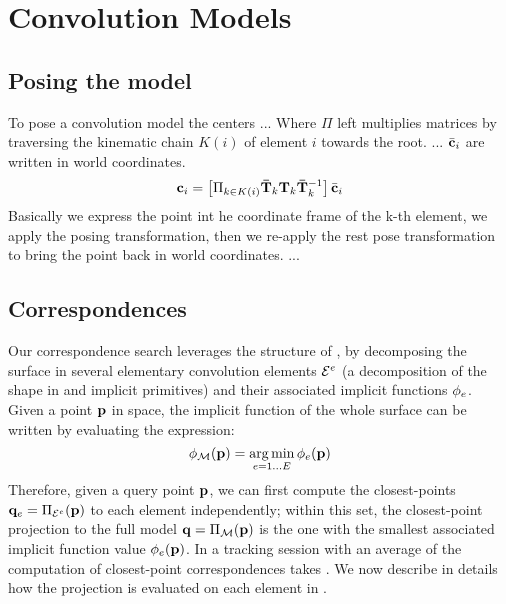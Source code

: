 \section{Convolution Models}


\subsection{Posing the model}
\label{sec:posing}
% 
\begin{DRAFT}
To pose a convolution model the centers ... 
Where $\Pi$ left multiplies matrices by traversing the kinematic chain $K(i)$ of element $i$ towards the root.
... $\bar{\mathbf{c}}_i$ are written in world coordinates.
% 
\begin{equation}
\mathbf{c}_i = \left[ \Pi_{k \in K(i)} \mathbf{\bar{T}}_k \mathbf{T}_k \mathbf{\bar{T}}_k^{-1} \right] \bar{\mathbf{c}}_i
\label{eq:kinematic}
\end{equation}
% 
Basically we express the point int he coordinate frame of the k-th element, we apply the posing transformation, then we re-apply the rest pose transformation to bring the point back in world coordinates. ... 
\end{DRAFT}

\subsection{Correspondences}
\label{sec:corresp}
Our correspondence search leverages the structure of , by decomposing the surface in several elementary convolution elements $\mathcal{E}^e$ (a decomposition of the shape in  and  implicit primitives) and their associated implicit functions $\phi_e$. Given a point $\mathbf{p}$ in space, the implicit function of the whole surface can be written by evaluating the expression:
\begin{equation}
\phi_{\mathcal{M}}(\mathbf{p}) = \operatorname*{arg\,min}_{e=1 \dots E} \phi_e(\mathbf{p})
\label{eq:piecewise}
\end{equation}
Therefore, given a query point $\mathbf{p}$, we can first compute the closest-points $\mathbf{q}_e = \Pi_{\mathcal{E}^e}(\mathbf{p})$ to each element independently; within this set, the closest-point projection to the full model $\mathbf{q} = \Pi_{\mathcal{M}}(\mathbf{p})$ is the one with the smallest associated implicit function value $\phi_e(\mathbf{p})$. In a tracking session with an average of  the computation of closest-point correspondences takes . We now describe in details how the projection is evaluated on each element in . 

